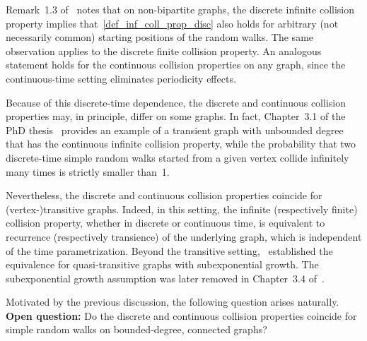 \documentclass[a4paper,11pt]{article}
\newcommand{\cmc}[1]{{\color{blue}{ \bf [~Carlos:\ }\emph{#1}\textbf{~]}}}
\newcommand{\jm}[1]{{\color{red} #1}}
\theoremstyle{definition}
\begin{document}
Remark~1.3 of~\cite{HutchcroftPeres2015} notes that on non-bipartite graphs, the discrete infinite collision property implies that~\eqref{def_inf_coll_prop_disc} also holds for arbitrary (not necessarily common) starting positions of the random walks. The same observation applies to the discrete finite collision property. An analogous statement holds for the continuous collision properties on any graph, since the continuous-time setting eliminates periodicity effects.

Because of this discrete-time dependence, the discrete and continuous collision properties may, in principle, differ on some graphs. In fact, Chapter~3.1 of the PhD thesis~\cite{Montgomery13} provides an example of a transient graph with unbounded degree that has the continuous infinite collision property, while the probability that two discrete-time simple random walks started from a given vertex collide infinitely many times is strictly smaller than~1.  

Nevertheless, the discrete and continuous collision properties coincide for (vertex-)transitive graphs. Indeed, in this setting, the infinite (respectively finite) collision property, whether in discrete or continuous time, is equivalent to recurrence (respectively transience) of the underlying graph, which is independent of the time parametrization. Beyond the transitive setting,~\cite{Chen08} established the equivalence for quasi-transitive graphs with subexponential growth. The subexponential growth assumption was later removed in Chapter~3.4 of~\cite{Montgomery13}. 

Motivated by the previous discussion, the following question arises naturally. \\[-2mm]

\noindent \textbf{Open question: } Do the discrete and continuous collision properties coincide for simple random walks on bounded-degree, connected graphs?

\end{document}
